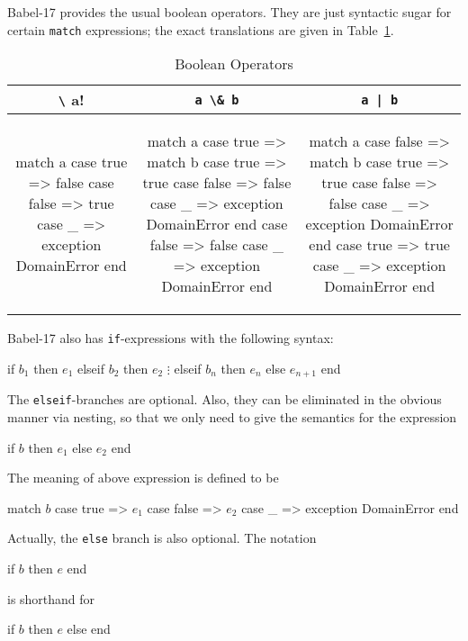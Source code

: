 \documentclass[11pt]{amsart}
\newcommand{\babelsrc}[1] {\lstinline!#1!}
\begin{document}
Babel-17 provides the usual boolean operators. They are just syntactic sugar for certain \babelsrc{match} expressions; the exact translations are given in Table~\ref{tab:booleanops}.
\begin{table}
\caption{Boolean Operators}
\begin{tabular}{c|c|c}
\babelsrc{\! a} & \babelsrc{a \& b} &\babelsrc{a | b} \\\hline
 \small
\begin{babellisting}
match a 
  case true => 
    false 
  case false => 
    true
  case _ => 
    exception DomainError
end
\end{babellisting}
 & 
 \small
\begin{babellisting}
match a 
  case true => 
    match b 
      case true => 
        true
      case false => 
        false
      case _ => 
        exception DomainError
    end 
  case false => 
    false
  case _ => 
    exception DomainError
end
\end{babellisting}
 & 
 \small
\begin{babellisting}
match a 
  case false => 
    match b 
      case true => 
        true
      case false => 
        false
      case _ => 
        exception DomainError
    end 
  case true => 
    true
  case _ => 
    exception DomainError
end
\end{babellisting}
\end{tabular}
\label{tab:booleanops}
\end{table}
Babel-17 also has \babelsrc{if}-expressions with the following syntax:
\begin{babellisting}
if $b_1$ then
  $e_1$
elseif $b_2$ then
  $e_2$
  $\vdots$
elseif $b_n$ then
  $e_n$
else
  $e_{n+1}$
end
\end{babellisting}
The \babelsrc{elseif}-branches are  optional. Also, they can be eliminated in the obvious manner via nesting, so that we only need to give the semantics for the expression
\begin{babellisting}
if $b$ then $e_1$ else $e_2$ end
\end{babellisting}
The meaning of above expression is defined to be
\begin{babellisting}
match $b$ 
  case true => $e_1$
  case false => $e_2$
  case _ => exception DomainError 
end
\end{babellisting}
Actually, the  \babelsrc{else} branch is also optional. The notation
\begin{babellisting}
if $b$ then $e$  end
\end{babellisting}
is shorthand for
\begin{babellisting}
if $b$ then $e$  else end
\end{babellisting}
\end{document}

